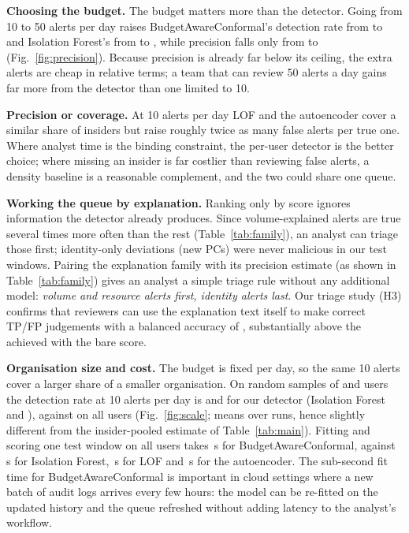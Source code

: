 \textbf{Choosing the budget.} The budget matters more than the detector. Going from 10 to 50 alerts
per day raises BudgetAwareConformal's detection rate from \DROursBA{} to \DROursBB{} and Isolation
Forest's from \DRIFBA{} to \DRIFBB{}, while precision falls only from \POursBA{} to \POursBB{}
(Fig.~\ref{fig:precision}). Because precision is already far below its ceiling, the extra alerts are
cheap in relative terms; a team that can review 50 alerts a day gains far more from the detector
than one limited to 10.

\textbf{Precision or coverage.} At 10 alerts per day LOF and the autoencoder cover a similar share of
insiders but raise roughly twice as many false alerts per true one. Where analyst time is the
binding constraint, the per-user detector is the better choice; where missing an insider is far
costlier than reviewing false alerts, a density baseline is a reasonable complement, and the two
could share one queue.

\textbf{Working the queue by explanation.} Ranking only by score ignores information the detector
already produces. Since volume-explained alerts are true several times more often than the rest
(Table~\ref{tab:family}), an analyst can triage those first; identity-only deviations (new PCs) were
never malicious in our test windows. Pairing the explanation family with its precision estimate
(as shown in Table~\ref{tab:family}) gives an analyst a simple triage rule without any additional
model: \emph{volume and resource alerts first, identity alerts last}. Our triage study (H3) confirms
that reviewers can use the explanation text itself to make correct TP/FP judgements with a
balanced accuracy of \TriageBAB{}, substantially above the \TriageBAA{} achieved with the bare score.

\textbf{Organisation size and cost.} The budget is fixed per day, so the same 10 alerts cover a
larger share of a smaller organisation. On random samples of \NUsersSmall{} and \NUsersMid{} users the
detection rate at 10 alerts per day is \DRSweepOursSmall{} and \DRSweepOursMid{} for our detector
(Isolation Forest \DRSweepIFSmall{} and \DRSweepIFMid), against \DRSweepOursFull{} on all
\NUsersFull{} users (Fig.~\ref{fig:scale}; means over runs, hence slightly different from the
insider-pooled estimate of Table~\ref{tab:main}). Fitting and scoring one test window on all users takes
\SecsOurs\,s for BudgetAwareConformal, against \SecsIF\,s for Isolation Forest, \SecsLOF\,s for LOF
and \SecsAE\,s for the autoencoder. The sub-second fit time for BudgetAwareConformal is important
in cloud settings where a new batch of audit logs arrives every few hours: the model can be
re-fitted on the updated history and the queue refreshed without adding latency to the analyst's
workflow.

